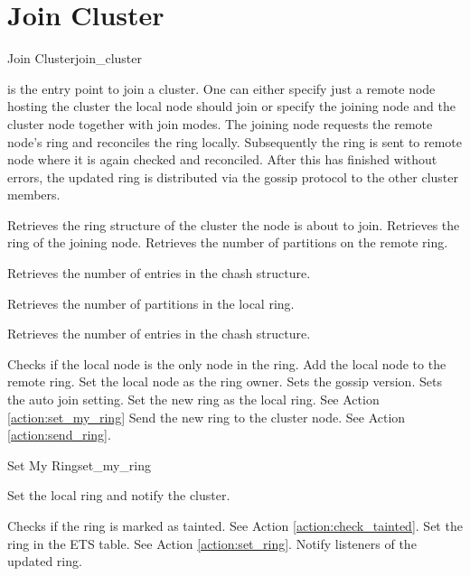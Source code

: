 \section{Join Cluster}
\begin{actionbox}{Join Cluster}{join_cluster}
	\begin{action}
		 is the entry point to join a cluster.
		One can either specify just a remote node hosting the cluster the local node should join or specify the joining node and the cluster node together with join modes.
		The joining node requests the remote node's ring and reconciles the ring locally.
		Subsequently the ring is sent to remote node where it is again checked and reconciled.
		After this has finished without errors, the updated ring is distributed via the gossip protocol to the other cluster members.
		\begin{action}
			 Retrieves the ring structure of the cluster the node is about to join.
			 Retrieves the ring of the joining node.
			 Retrieves the number of partitions on the remote ring.
			\begin{action}
				 Retrieves the number of entries in the chash structure.
			\end{action}
			 Retrieves the number of partitions in the local ring.
			\begin{action}
				 Retrieves the number of entries in the chash structure.
			\end{action}
			 Checks if the local node is the only node in the ring.
			 Add the local node to the remote ring.
			 Set the local node as the ring owner.
			 Sets the gossip version.
			 Sets the auto join setting.
			 Set the new ring as the local ring.
			See Action \ref{action:set_my_ring}
			 Send the new ring to the cluster node.
			See Action \ref{action:send_ring}.
		\end{action}
	\end{action}
\end{actionbox}

\begin{actionbox}{Set My Ring}{set_my_ring}
	\begin{action}
		 Set the local ring and notify the cluster.
		\begin{action}
			 Checks if the ring is marked as tainted.
			See Action \ref{action:check_tainted}.
			 Set the ring in the ETS table. See Action \ref{action:set_ring}.
			 Notify listeners of the updated ring.
		\end{action}
	\end{action}
\end{actionbox}

